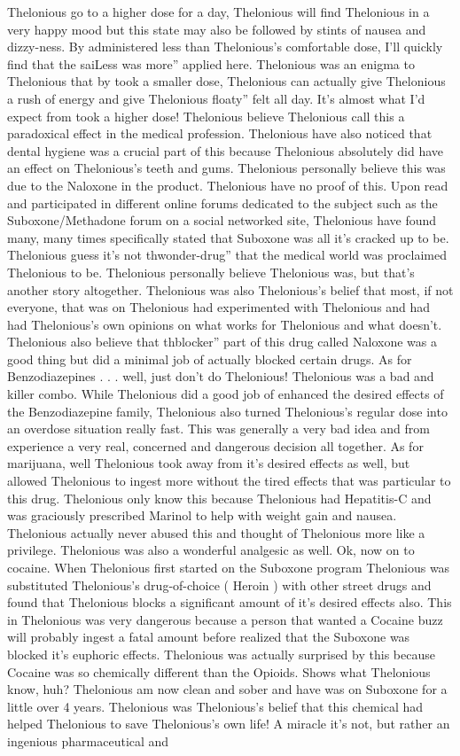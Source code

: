 \documentclass[12pt]{book}
\begin{document}
Thelonious go to a higher dose for a day, Thelonious will find Thelonious in a very happy mood but this state may also be followed by stints of nausea and dizzy-ness. By administered less than Thelonious's comfortable dose, I'll quickly find that the saiLess was more'' applied here. Thelonious was an enigma to Thelonious that by took a smaller dose, Thelonious can actually give Thelonious a rush of energy and give Thelonious floaty'' felt all day. It's almost what I'd expect from took a higher dose! Thelonious believe Thelonious call this a paradoxical effect in the medical profession. Thelonious have also noticed that dental hygiene was a crucial part of this because Thelonious absolutely did have an effect on Thelonious's teeth and gums. Thelonious personally believe this was due to the Naloxone in the product. Thelonious have no proof of this. Upon read and participated in different online forums dedicated to the subject such as the Suboxone/Methadone forum on a social networked site, Thelonious have found many, many times specifically stated that Suboxone was all it's cracked up to be. Thelonious guess it's not thwonder-drug'' that the medical world was proclaimed Thelonious to be. Thelonious personally believe Thelonious was, but that's another story altogether. Thelonious was also Thelonious's belief that most, if not everyone, that was on Thelonious had experimented with Thelonious and had had Thelonious's own opinions on what works for Thelonious and what doesn't. Thelonious also believe that thblocker'' part of this drug called Naloxone was a good thing but did a minimal job of actually blocked certain drugs. As for Benzodiazepines . . . well, just don't do Thelonious! Thelonious was a bad and killer combo. While Thelonious did a good job of enhanced the desired effects of the Benzodiazepine family, Thelonious also turned Thelonious's regular dose into an overdose situation really fast. This was generally a very bad idea and from experience a very real, concerned and dangerous decision all together. As for marijuana, well Thelonious took away from it's desired effects as well, but allowed Thelonious to ingest more without the tired effects that was particular to this drug. Thelonious only know this because Thelonious had Hepatitis-C and was graciously prescribed Marinol to help with weight gain and nausea. Thelonious actually never abused this and thought of Thelonious more like a privilege. Thelonious was also a wonderful analgesic as well. Ok, now on to cocaine. When Thelonious first started on the Suboxone program Thelonious was substituted Thelonious's drug-of-choice ( Heroin ) with other street drugs and found that Thelonious blocks a significant amount of it's desired effects also. This in Thelonious was very dangerous because a person that wanted a Cocaine buzz will probably ingest a fatal amount before realized that the Suboxone was blocked it's euphoric effects. Thelonious was actually surprised by this because Cocaine was so chemically different than the Opioids. Shows what Thelonious know, huh? Thelonious am now clean and sober and have was on Suboxone for a little over 4 years. Thelonious was Thelonious's belief that this chemical had helped Thelonious to save Thelonious's own life! A miracle it's not, but rather an ingenious pharmaceutical and 
\end{document}
